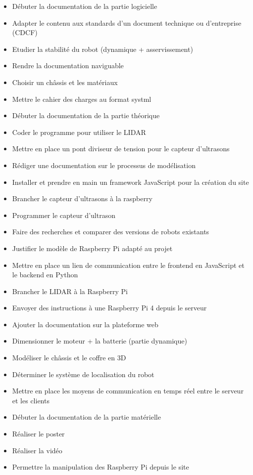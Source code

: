 \documentclass[a4paper,12pt]{report}  %
\begin{document}
\begin{itemize}
	\item Débuter la documentation de la partie logicielle
	\item Adapter le contenu aux standards d’un document technique ou d’entreprise (CDCF)
	\item Etudier la stabilité du robot (dynamique + asservissement)
	\item Rendre la documentation naviguable
	\item Choisir un châssis et les matériaux
	\item Mettre le cahier des charges au format systml
	\item Débuter la documentation de la partie théorique
	\item Coder le programme pour utiliser le LIDAR
	\item Mettre en place un pont diviseur de tension pour le capteur d'ultrasons
	\item Rédiger une documentation sur le processus de modélisation 
	\item Installer et prendre en main un framework JavaScript pour la création du site 
	\item Brancher le capteur d'ultrasons à la raspberry
	\item Programmer le capteur d'ultrason
	\item Faire des recherches et comparer des versions de robots existants
	\item Justifier le modèle de Raspberry Pi adapté au projet
	\item Mettre en place un lien de communication entre le frontend en JavaScript et le backend en Python
	\item Brancher le LIDAR à la Raspberry Pi
	\item Envoyer des instructions à une Raspberry Pi 4 depuis le serveur
	\item Ajouter la documentation sur la plateforme web
	\item Dimensionner le moteur + la batterie (partie dynamique)
	\item Modéliser le châssis et le coffre en 3D
	\item Déterminer le système de localisation du robot
	\item Mettre en place les moyens de communication en temps réel entre le serveur et les clients
	\item Débuter la documentation de la partie matérielle
	\item Réaliser le poster
	\item Réaliser la vidéo
	\item Permettre la manipulation des Raspberry Pi depuis le site

\end{itemize}
\end{document}
